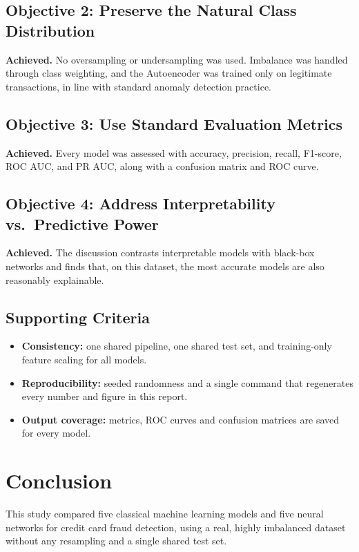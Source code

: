 \documentclass[journal]{IEEEtran}
\begin{document}
\subsection{Objective 2: Preserve the Natural Class Distribution}
\textbf{Achieved.} No oversampling or undersampling was used. Imbalance was handled through class weighting, and the Autoencoder was trained only on legitimate transactions, in line with standard anomaly detection practice.

\subsection{Objective 3: Use Standard Evaluation Metrics}
\textbf{Achieved.} Every model was assessed with accuracy, precision, recall, F1-score, ROC AUC, and PR AUC, along with a confusion matrix and ROC curve.

\subsection{Objective 4: Address Interpretability vs.\ Predictive Power}
\textbf{Achieved.} The discussion contrasts interpretable models with black-box networks and finds that, on this dataset, the most accurate models are also reasonably explainable.

\subsection{Supporting Criteria}
\begin{itemize}
  \item \textbf{Consistency:} one shared pipeline, one shared test set, and training-only feature scaling for all models.
  \item \textbf{Reproducibility:} seeded randomness and a single command that regenerates every number and figure in this report.
  \item \textbf{Output coverage:} metrics, ROC curves and confusion matrices are saved for every model.
\end{itemize}

\section{Conclusion}
This study compared five classical machine learning models and five neural networks for credit card fraud detection, using a real, highly imbalanced dataset without any resampling and a single shared test set.
\end{document}
